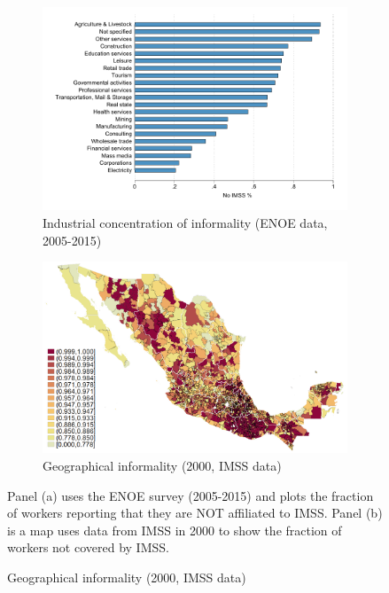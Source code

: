 \documentclass[oneside,11pt]{article}
\begin{document}
\vspace{.05in}
\begin{figure}[H]
     \caption{Industrial and Geographical concentration of informality}
    \label{informal_scian}
\begin{center}
    \begin{subfigure}{0.50\textwidth}
    \caption{Industrial concentration of informality (ENOE data, 2005-2015)}
        \includegraphics[width=\textwidth]{Figuras/catplot_scian_enoe.pdf}
    \end{subfigure}
    \begin{subfigure}{0.50\textwidth}
\caption{Geographical informality (2000, IMSS data)}
        \includegraphics[width=\textwidth]{Figuras/spmap_porc_inf_2000.png}
    \end{subfigure}
  \end{center}
    \scriptsize 
    Panel (a) uses the ENOE survey (2005-2015) and plots the fraction of workers reporting that they are NOT affiliated to IMSS. Panel (b) is a map uses data from IMSS in 2000 to show the fraction of workers not covered by IMSS.  
\end{figure}
\end{document}
